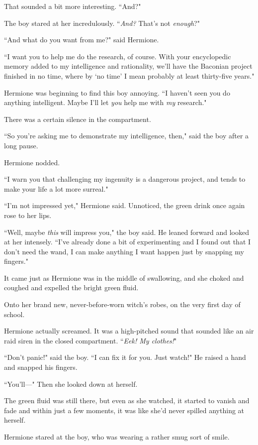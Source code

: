 That sounded a bit more interesting. ``And?"

The boy stared at her incredulously. ``\emph{And?} That's not \emph{enough}?"

``And what do you want from me?" said Hermione.

``I want you to help me do the research, of course. With your encyclopedic memory added to my intelligence and rationality, we'll have the Baconian project finished in no time, where by `no time' I mean probably at least thirty-five years."

Hermione was beginning to find this boy annoying. ``I haven't seen you do anything intelligent. Maybe I'll let \emph{you} help me with \emph{my} research."

There was a certain silence in the compartment.

``So you're asking me to demonstrate my intelligence, then," said the boy after a long pause.

Hermione nodded.

``I warn you that challenging my ingenuity is a dangerous project, and tends to make your life a lot more surreal."

``I'm not impressed yet," Hermione said. Unnoticed, the green drink once again rose to her lips.

``Well, maybe \emph{this} will impress you," the boy said. He leaned forward and looked at her intensely. ``I've already done a bit of experimenting and I found out that I don't need the wand, I can make anything I want happen just by snapping my fingers."

It came just as Hermione was in the middle of swallowing, and she choked and coughed and expelled the bright green fluid.

Onto her brand new, never-before-worn witch's robes, on the very first day of school.

Hermione actually screamed. It was a high-pitched sound that sounded like an air raid siren in the closed compartment. ``\emph{Eek! My clothes!}"

``Don't panic!" said the boy. ``I can fix it for you. Just watch!" He raised a hand and snapped his fingers.

``You'll---" Then she looked down at herself.

The green fluid was still there, but even as she watched, it started to vanish and fade and within just a few moments, it was like she'd never spilled anything at herself.

Hermione stared at the boy, who was wearing a rather smug sort of smile.

